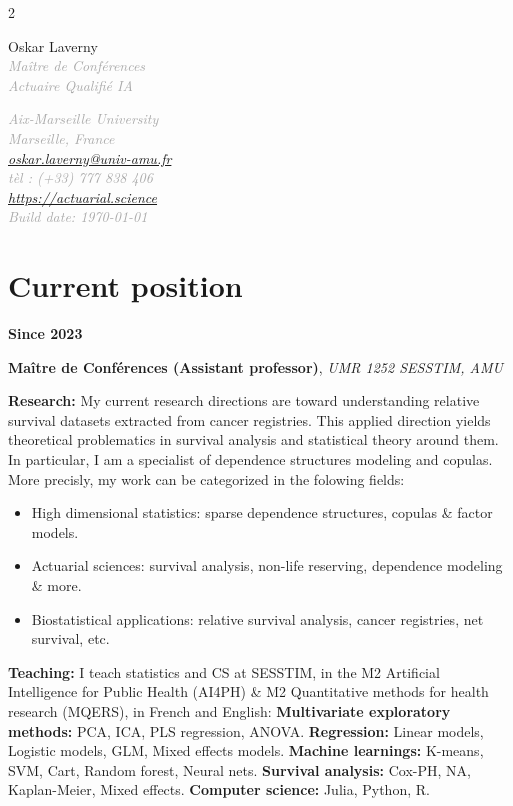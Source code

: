 \documentclass[a4paper,11pt]{article}
\newcommand{\tabcv}[2]{
\begin{minipage}[t]{0.12\linewidth}
\textbf{\footnotesize #1}
\end{minipage}\hfill
\begin{minipage}[t]{0.85\linewidth}
#2
\end{minipage}
\vspace{1em}
}
\newcommand*{\namestyle}[1]{{\fontsize{28}{30}\mdseries\upshape#1}}
\newcommand*{\titlestyle}[1]{{\LARGE\mdseries\slshape\textcolor{DarkGrey}{#1}}}
\newcommand*{\addressstyle}[1]{{\small\mdseries\slshape\textcolor{DarkGrey}{#1}}}
\newcommand{\bull}[1]{\textbf{#1}}
\begin{document}
\begin{multicols}{2}\raggedright
\namestyle{Oskar Laverny} \\
\vspace{0.5cm}
\titlestyle{Maître de Conférences}\\
\vspace{0.2cm}
\titlestyle{Actuaire Qualifié IA}
\columnbreak

\raggedleft
\addressstyle{
Aix-Marseille University\\
Marseille, France\\
\url{oskar.laverny@univ-amu.fr}\\
tèl : (+33) 777 838 406\\
\url{https://actuarial.science}\\
Build date: \today
}
\end{multicols}
\vspace{0.2cm}

\section{Current position}

\tabcv{Since 2023}{
\textbf{Maître de Conférences (Assistant professor)},
\textit{UMR 1252 SESSTIM, AMU} \\[0.5em]
{\footnotesize
  \bull{Research:} My current research directions are toward understanding relative survival datasets extracted from cancer registries. This applied direction yields theoretical problematics in survival analysis and statistical theory around them. In particular, I am a specialist of dependence structures modeling and copulas. More precisly, my work can be categorized in the folowing fields:
  \begin{itemize}
    \item High dimensional statistics: sparse dependence structures, copulas \& factor models.
    \item Actuarial sciences: survival analysis, non-life reserving, dependence modeling \& more.
    \item Biostatistical applications: relative survival analysis, cancer registries, net survival, etc.
  \end{itemize}
  \bull{Teaching:} I teach statistics and CS at SESSTIM, in the M2 Artificial Intelligence for Public Health (AI4PH)  \& M2 Quantitative methods for health research (MQERS), in French and English:
  \textbf{Multivariate exploratory methods:} PCA, ICA, PLS regression, ANOVA. 
  \textbf{Regression:} Linear models, Logistic models, GLM, Mixed effects models. 
  \textbf{Machine learnings:} K-means, SVM, Cart, Random forest, Neural nets. 
  \textbf{Survival analysis:} Cox-PH, NA, Kaplan-Meier, Mixed effects.
  \textbf{Computer science:} Julia, Python, R.
}
}
\end{document}

